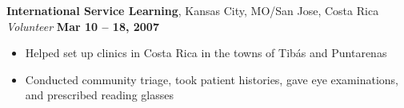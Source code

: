 \documentclass{article}
\begin{document}
{\bf International Service Learning}, Kansas City, MO/San Jose, Costa Rica\\
{\it Volunteer} \hfill {\bf Mar 10 -- 18, 2007}
 \begin{itemize} \itemsep -2pt
  \item Helped set up clinics in Costa Rica in the towns of Tib\'{a}s and Puntarenas
  \item Conducted community triage, took patient histories, gave eye examinations, and prescribed reading glasses
 \end{itemize}
\end{document}
